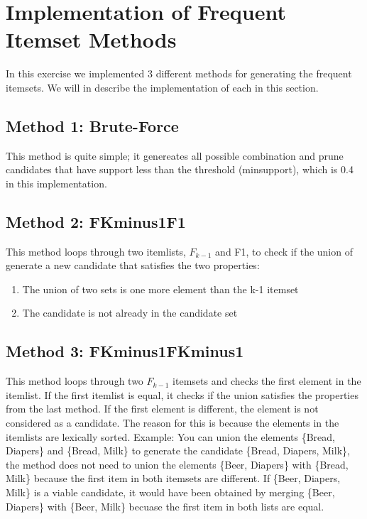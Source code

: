 \section{Implementation of Frequent Itemset Methods}
	
	In this exercise we implemented 3 different methods for generating the frequent 
	itemsets. We will in describe the implementation of each in this section.

	\subsection{Method 1: Brute-Force}
		This method is quite simple; it genereates all possible combination and 
		prune candidates that have support less than the threshold (minsupport), which
		is 0.4 in this implementation. 

	\subsection{Method 2: FKminus1F1}
		This method loops through two itemlists,  $F_{k-1}$ and F1, to check if the union
		of generate a new candidate that satisfies the two properties:
			\begin{enumerate}
				\item The union of two sets is one more element than the k-1 itemset
				\item The candidate is not already in the candidate set
			\end{enumerate}

	\subsection{Method 3: FKminus1FKminus1}
		This method loops through two $F_{k-1}$ itemsets and checks the first element in 
		the itemlist. If the first itemlist is equal, it checks if the union satisfies
		the properties from the last method. If the first element is different, the element
		is not considered as a candidate. The reason for this is because the elements in 
		the itemlists are lexically sorted. Example:
		You can union the elements \{Bread, Diapers\} and \{Bread, Milk\} to generate
		the candidate \{Bread, Diapers, Milk\}, the method does not need to union the
		elements \{Beer, Diapers\} with \{Bread, Milk\} because the first item in both
		itemsets are different. If \{Beer, Diapers, Milk\} is a viable candidate,
		it would have been obtained by merging \{Beer, Diapers\} with \{Beer, Milk\} becuase
		the first item in both lists are equal. 


